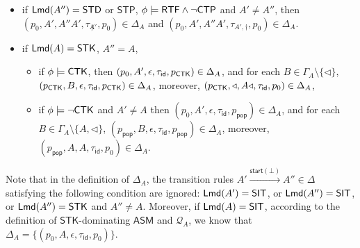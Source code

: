 \documentclass[preprint,12pt]{elsarticle}
\newcommand\Qq{{\mathcal{Q} }}
\newcommand\lmd{{\sf Lmd}}
\newcommand\singletask{{\sf STK}}
\newcommand\singleinstance{{\sf SIT}}
\newcommand\ctpflag{{\sf CTP}}
\newcommand\ctkflag{{\sf CTK}}
\newcommand\rtfflag{{\sf RTF}}
\newcommand{\AMASS}{\textsf{ASM}}
\newcommand\startactivity{{\mathsf{start} }}
\newcommand{\STK}{\mathsf{STK}}
\newcommand{\STD}{\mathsf{STD}}
\newcommand{\STP}{\mathsf{STP}}
\newcommand{\id}{\mathsf{id}}
\newcommand\pop{\mathsf{pop}}
\begin{document}
{\begin{itemize}
\begin{itemize}
\begin{itemize}
\begin{itemize}
					\item $(p_0, A', \varepsilon, \tau_{A'}, p_{A'}) \in \Delta_{A}$, and for each $B \in \Gamma_A\setminus\{A'\}$, $(p_{A'}, B, \varepsilon, \tau_{\id}, p_{A'}) \in \Delta_{A}$, moreover, $(p_{A'}, A'', A'', \tau_{id}, p_0)  \in \Delta_{A}$, 
				\end{itemize}
				\item if $\lmd(A'') = \STD$ or $\STP$, $\phi\models\rtfflag\wedge\neg\ctpflag$ and $A'\neq A''$,
                then $(p_0, A', A''A', \tau_{\not A'}, p_0) \in \Delta_{A}$ 
                and $(p_0, A', A''A', \tau_{A', \dag}, p_0) \in \Delta_{A}$.
                \item if $\lmd(A) = \STK$, $A'' = A$, 
			\begin{itemize}
				\item if $\phi\models\ctkflag$, then $(p_0, A', \epsilon, \tau_{\id}, p_{\ctkflag}) \in \Delta_{A}$, and for each $B\in\Gamma_A\setminus\{\triangleleft\}$, $(p_{\ctkflag},B,\epsilon,\tau_{\id}, p_{\ctkflag})\in\Delta_{A}$, moreover, $(p_{\ctkflag},\triangleleft,A\triangleleft,\tau_{\id},p_0)\in\Delta_{A}$, 
				\item if $\phi\models\neg\ctkflag$ and $A'\neq A$ then 
                $(p_0, A',\epsilon,\tau_{\id},p_{\pop})\in\Delta_{A}$, and for each $B\in\Gamma_A\setminus\{A,\triangleleft\}$, $(p_{\pop},B,\epsilon,\tau_{\id},p_{\pop})\in\Delta_{A}$, moreover, $(p_{\pop},A,A,\tau_{\id},p_0)\in\Delta_{A}$.
			\end{itemize}
			\end{itemize}
        \end{itemize}
Note that in the definition of $\Delta_{A}$, the transition rules $A' \xrightarrow{\startactivity(\bot)} A'' \in \Delta$ satisfying the following condition are ignored: $\lmd(A') = \singleinstance$, or $\lmd(A'') = \singleinstance$, or $\lmd(A'') = \singletask$ and $A'' \neq A$. 
Moreover, if $\lmd(A) = \singleinstance$, according to the definition of $\STK$-dominating $\AMASS$ and $\Qq_A$, we know that $\Delta_A = \{(p_0,A,\epsilon,\tau_\id, p_0)\}$.
\end{itemize}
}
\end{document}
